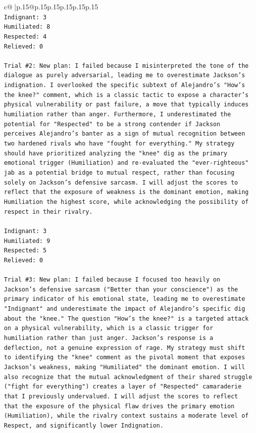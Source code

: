 \documentclass{article}
\begin{document}
{\begin{supertabular}{c@{$\;$}|p{.15\linewidth}@{}p{.15\linewidth}p{.15\linewidth}p{.15\linewidth}p{.15\linewidth}p{.15\linewidth}}
{{{\\ 
\texttt{Indignant: 3} \\
\texttt{Humiliated: 8} \\
\texttt{Respected: 4} \\
\texttt{Relieved: 0} \\
\\ 
\texttt{Trial \#2: New plan: I failed because I misinterpreted the tone of the dialogue as purely adversarial, leading me to overestimate Jackson's indignation. I overlooked the specific subtext of Alejandro's "How's the knee?" comment, which is a classic tactic to expose a character's physical vulnerability or past failure, a move that typically induces humiliation rather than anger. Furthermore, I underestimated the potential for "Respected" to be a strong contender if Jackson perceives Alejandro's banter as a sign of mutual recognition between two hardened rivals who have "fought for everything." My strategy should have prioritized analyzing the "knee" dig as the primary emotional trigger (Humiliation) and re{-}evaluated the "ever{-}righteous" jab as a potential bridge to mutual respect, rather than focusing solely on Jackson's defensive sarcasm. I will adjust the scores to reflect that the exposure of weakness is the dominant emotion, making Humiliation the highest score, while acknowledging the possibility of respect in their rivalry.} \\
\\ 
\texttt{Indignant: 3} \\
\texttt{Humiliated: 9} \\
\texttt{Respected: 5} \\
\texttt{Relieved: 0} \\
\\ 
\texttt{Trial \#3: New plan: I failed because I focused too heavily on Jackson's defensive sarcasm ("Better than your conscience") as the primary indicator of his emotional state, leading me to overestimate "Indignant" and underestimate the impact of Alejandro's specific dig about the "knee." The question "How's the knee?" is a targeted attack on a physical vulnerability, which is a classic trigger for humiliation rather than just anger. Jackson's response is a deflection, not a genuine expression of rage. My strategy must shift to identifying the "knee" comment as the pivotal moment that exposes Jackson's weakness, making "Humiliated" the dominant emotion. I will also recognize that the mutual acknowledgment of their shared struggle ("fight for everything") creates a layer of "Respected" camaraderie that I previously undervalued. I will adjust the scores to reflect that the exposure of the physical flaw drives the primary emotion (Humiliation), while the rivalry context sustains a moderate level of Respect, and significantly lower Indignation.} \\
}}}
\end{supertabular}}
\end{document}
